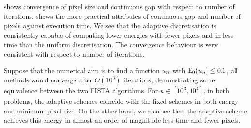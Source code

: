 \documentclass[10pt,a4paper,onecolumn]{article}
\numberwithin{equation}{section}
\newcommand{\op}[1]{\operatorname{#1}}\newcommand{\overtext}[2]{\stackrel{\text{#1}}{#2}}
\newcommand*{\Func}[1]{%
	\IfEqCase{#1}{%
		{0}{\op{E}}%
		{1}{\op{F}}%
		{2}{\op{G}}%
		{3}{\op{H}}%
	}[\op{F}#1]%
}
\newcommand*{\varf}[1]{%
	\IfEqCase{#1}{%
		{0}{u}%
		{1}{v}%
		{2}{w}%
	}[u#1]%
}
\begin{document}
 shows convergence of pixel size and continuous gap with respect to number of iterations.  shows the more practical attributes of continuous gap and number of pixels against execution time. We see that the adaptive discretisation is consistently capable of computing lower energies with fewer pixels and in less time than the uniform discretisation. The convergence behaviour is very consistent with respect to number of iterations.

Suppose that the numerical aim is to find a function $\varf0_n$ with $\Func0_0(\varf0_n)\leq 0.1$, all methods would converge after $O(10^3)$ iterations, demonstrating some equivalence between the two FISTA algorithms. For $n\in[10^3,10^4]$, in both problems, the adaptive schemes coincide with the fixed schemes in both energy and minimum pixel size. On the other hand, we also see that the adaptive scheme achieves this energy in almost an order of magnitude less time and fewer pixels.
\end{document}
